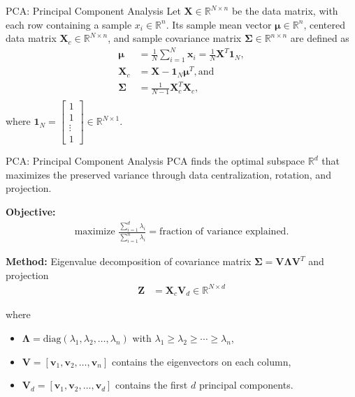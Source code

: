 \documentclass{beamer}
\begin{document}
\begin{frame}{PCA: Principal Component Analysis}
Let $\mathbf{X}\in \mathbb{R}^{N \times n}$ be the data matrix, with
each row containing a sample $x_i \in \mathbb{R}^n$. Its sample mean
vector $\boldsymbol{\mu}\in \mathbb{R}^n$, centered data matrix
$\mathbf{X}_c \in \mathbb{R}^{N \times n}$, and sample covariance
matrix $\boldsymbol{\Sigma} \in \mathbb{R}^{n \times n}$ are defined
as
\begin{align*}
\boldsymbol{\mu} &= \frac{1}{N}\sum_{i=1}^{N} \mathbf{x}_i = \frac{1}{N}\mathbf{X}^T\mathbf{1}_N, \\
\mathbf{X}_c &= \mathbf{X} - \mathbf{1}_N\boldsymbol{\mu}^T, \mbox{and} \\
\boldsymbol{\Sigma} &= \frac{1}{N-1}\mathbf{X}_c^T\mathbf{X}_c, \\
\end{align*}
where $\mathbf{1}_N = \begin{bmatrix} 1 \\ 1 \\ \vdots \\ 1 \end{bmatrix} \in \mathbb{R}^{N \times 1}$.
\end{frame}

\begin{frame}{PCA: Principal Component Analysis}
  PCA finds the optimal subspace $\mathbb{R}^d$ that \alert{maximizes}
  the preserved variance through data centralization, rotation, and
  projection.
  
  \textbf{Objective:}
  \begin{align*}
    \text{maximize } \frac{\sum_{i=1}^{d} \lambda_i}{\sum_{i=1}^{n} \lambda_i} = \text{fraction of variance explained.}
  \end{align*}
  
  \textbf{Method:} Eigenvalue decomposition of covariance matrix
  $\boldsymbol{\Sigma}=\mathbf{V}\boldsymbol{\Lambda}\mathbf{V}^T$ and projection
  \begin{align*}
    \mathbf{Z} &= \mathbf{X}_c\mathbf{V}_d \in \mathbb{R}^{N \times d}
  \end{align*}
  
  where
  \begin{itemize}
  \item $\boldsymbol{\Lambda} = \text{diag}(\lambda_1, \lambda_2, \ldots, \lambda_n)$ with $\lambda_1 \geq \lambda_2 \geq \cdots \geq \lambda_n$,
  \item $\mathbf{V} = [\mathbf{v}_1, \mathbf{v}_2, \ldots, \mathbf{v}_n]$ contains the eigenvectors on each column,
  \item $\mathbf{V}_d = [\mathbf{v}_1, \mathbf{v}_2, \ldots, \mathbf{v}_d]$ contains the first $d$ \alert{principal components}.
  \end{itemize}
\end{frame}
\end{document}
